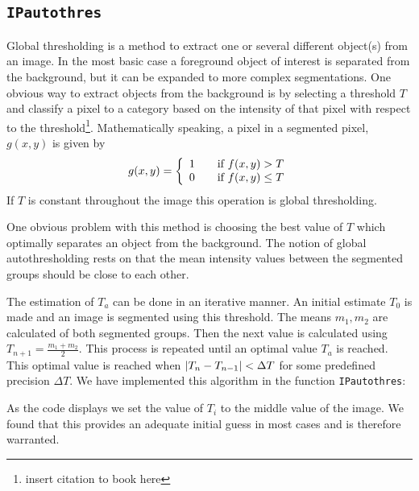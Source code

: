 \subsection{\texttt{IPautothres}}
Global thresholding is a method to extract one or several different object(s) from an image. 
In the most basic case a foreground object of interest is separated from the background, but it can be expanded to more complex segmentations. 
One obvious way to extract objects from the background is by selecting a threshold \(T\) and classify a pixel to a category based on the intensity of that pixel with respect to the threshold\footnote{insert citation to book here}. 
Mathematically speaking, a pixel in a segmented pixel, \(g(x, y)\) is given by 
\[ 
  g(x,y) = \left\{ 
  \begin{array}{l l}
    1 & \quad \text{if \(f(x, y) > T\)}\\
    0 & \quad \text{if \(f(x, y) \leq T\)}
  \end{array} \right.
\]
If \(T\) is constant throughout the image this operation is global thresholding.

One obvious problem with this method is choosing the best value of \(T\) which optimally separates an object from the background. 
The notion of global autothresholding rests on that the mean intensity values between the segmented groups should be close to each other.

The estimation of \(T_a\) can be done in an iterative manner. 
An initial estimate \(T_0\) is made and an image is segmented using this threshold. 
The means \(m_1, m_2\) are calculated of both segmented groups.
Then the next value is calculated using \(T_{n+1} = \frac{m_1 + m_2}{2}\).
This process is repeated until an optimal value \(T_a\) is reached. 
This optimal value is reached when \(\lvert T_n - T_{n - 1}\rvert < \Delta T\) for some predefined precision \(\Delta T\).
\clearpage
We have implemented this algorithm in the function \texttt{IPautothres}:

As the code displays we set the value of \(T_i\) to the middle value of the image. 
We found that this provides an adequate initial guess in most cases and is therefore warranted. 

